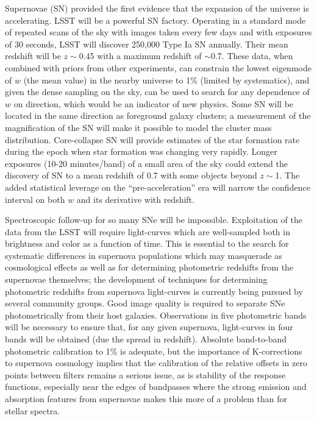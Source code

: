 Supernovae (SN) provided the first evidence that the expansion of the
universe is accelerating. LSST will be a powerful SN factory. Operating in
a standard mode of repeated scans of the sky with images taken every few
days and with exposures of 30 seconds, LSST will discover 250,000 Type Ia
SN annually. Their mean redshift will be $z\sim$0.45 with a maximum
redshift of $\sim$0.7. These data, when combined with priors from other
experiments, can constrain the lowest eigenmode of $w$ (\ie the mean
value) in the nearby universe to 1\% (limited by systematics),
and given the dense sampling on
the sky, can be used to search for any dependence of $w$ on direction,
which would be an indicator of new physics.  Some SN will be located in the
same direction as foreground galaxy clusters; a measurement of the
magnification of the SN will make it possible to model the cluster mass
distribution. Core-collapse SN will provide estimates of the star formation
rate during the epoch when star formation was changing very rapidly.
Longer exposures (10-20 minutes/band) of a small area of the sky could
extend the discovery of SN to a mean redshift of 0.7 with some objects
beyond $z\sim$1.  The added statistical leverage on the
``pre-acceleration'' era will narrow the confidence interval on both $w$
and its derivative with redshift.

Spectroscopic follow-up for so many SNe will be impossible. Exploitation of
the data from the LSST will require light-curves which are well-sampled both
in brightness and color as a function of time. This is essential to the
search for systematic differences in supernova populations which may
masquerade as cosmological effects as well as for determining photometric
redshifts from the supernovae themselves; the development of techniques for
determining photometric redshifts from supernova light-curves is currently
being pursued by several community groups. Good image quality is required
to separate SNe photometrically from their host galaxies. Observations in
five photometric bands will be necessary to ensure that, for any given
supernova, light-curves in four bands will be obtained (due the spread in
redshift). Absolute band-to-band photometric calibration to 1\% is adequate, but
the importance of K-corrections to supernova cosmology implies that the
calibration of the relative offsets in zero points between filters remains
a serious issue, as
is stability of the response functions, especially near the edges of
bandpasses where the strong emission and absorption features from supernovae
makes this more of a problem than for stellar spectra.

